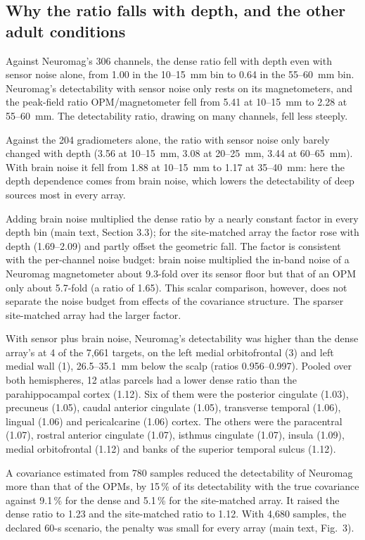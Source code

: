 \documentclass[preprint,12pt,authoryear,a4paper]{elsarticle}
\begin{document}
\subsection{Why the ratio falls with depth, and the other adult conditions}\label{sec:S3.3}

Against Neuromag's 306 channels, the dense ratio fell with depth even with sensor noise alone, from 1.00 in the 10–15~mm bin to 0.64 in the 55–60~mm bin. Neuromag's detectability with sensor noise only rests on its magnetometers, and the peak-field ratio OPM/magnetometer fell from 5.41 at 10–15~mm to 2.28 at 55–60~mm. The detectability ratio, drawing on many channels, fell less steeply.

Against the 204 gradiometers alone, the ratio with sensor noise only barely changed with depth (3.56 at 10–15~mm, 3.08 at 20–25~mm, 3.44 at 60–65~mm). With brain noise it fell from 1.88 at 10–15~mm to 1.17 at 35–40~mm: here the depth dependence comes from brain noise, which lowers the detectability of deep sources most in every array.

Adding brain noise multiplied the dense ratio by a nearly constant factor in every depth bin (main text, Section 3.3); for the site-matched array the factor rose with depth (1.69–2.09) and partly offset the geometric fall. The factor is consistent with the per-channel noise budget: brain noise multiplied the in-band noise of a Neuromag magnetometer about 9.3-fold over its sensor floor but that of an OPM only about 5.7-fold (a ratio of 1.65). This scalar comparison, however, does not separate the noise budget from effects of the covariance structure. The sparser site-matched array had the larger factor.

With sensor plus brain noise, Neuromag's detectability was higher than the dense array's at 4 of the 7,661 targets, on the left medial orbitofrontal (3) and left medial wall (1), 26.5–35.1~mm below the scalp (ratios 0.956–0.997). Pooled over both hemispheres, 12 atlas parcels had a lower dense ratio than the parahippocampal cortex (1.12). Six of them were the posterior cingulate (1.03), precuneus (1.05), caudal anterior cingulate (1.05), transverse temporal (1.06), lingual (1.06) and pericalcarine (1.06) cortex. The others were the paracentral (1.07), rostral anterior cingulate (1.07), isthmus cingulate (1.07), insula (1.09), medial orbitofrontal (1.12) and banks of the superior temporal sulcus (1.12).

A covariance estimated from 780 samples reduced the detectability of Neuromag more than that of the OPMs, by 15\,\% of its detectability with the true covariance against 9.1\,\% for the dense and 5.1\,\% for the site-matched array. It raised the dense ratio to 1.23 and the site-matched ratio to 1.12. With 4,680 samples, the declared 60-s scenario, the penalty was small for every array (main text, Fig.~3).
\end{document}
